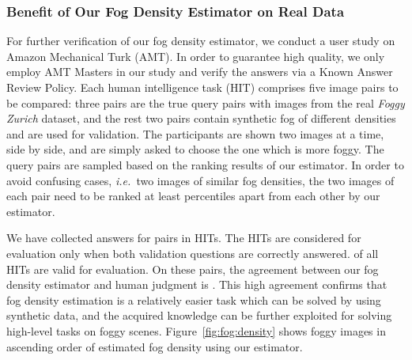 \documentclass[twocolumn]{svjour3}          \smartqed  \usepackage{graphicx}
\newcommand{\ie}{\mbox{\emph{i.e.\ }}}
\begin{document}

\subsubsection{Benefit of Our Fog Density Estimator on Real Data}
\label{sec:exp:fog:density}


For further verification of our fog density estimator, we conduct a user study on Amazon Mechanical Turk (AMT). In order to guarantee high quality, we only employ AMT Masters in our study and verify the answers via a Known Answer Review Policy. Each human intelligence task (HIT) comprises five image pairs to be compared: three pairs are the true query pairs with images from the real \emph{Foggy Zurich} dataset, and the rest two pairs contain synthetic fog of different densities and are used for validation. The participants are shown two images at a time, side by side, and are simply asked to choose the one which is more foggy. The query pairs are sampled based on the ranking results of our estimator. In order to avoid confusing cases, \ie{}two images of similar fog densities, the two images of each pair need to be ranked at least  percentiles apart from each other by our estimator.

We have collected answers for  pairs in  HITs. The HITs are considered for evaluation only when both validation questions are correctly answered.  of all HITs are valid for evaluation. On these  pairs, the agreement between our fog density estimator and human judgment is . This high agreement confirms that fog density estimation is a relatively easier task which can be solved by using synthetic data, and the acquired knowledge can be further exploited for solving high-level tasks on foggy scenes. Figure~\ref{fig:fog:density} shows foggy images in ascending order of estimated fog density using our estimator.
\end{document}
